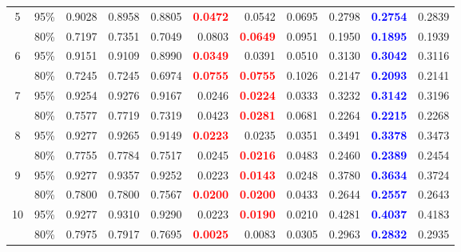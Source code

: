 \begin{longtable}{ccrrrrrrrrr}
\cmidrule(lr){1-11}
5 & 95\% & 0.9028 & 0.8958 & 0.8805 & \textcolor{red}{\textbf{0.0472}} & 0.0542 & 0.0695 & 0.2798 & \textcolor{blue}{\textbf{0.2754}} & 0.2839 \\
 & 80\% & 0.7197 & 0.7351 & 0.7049 & 0.0803 & \textcolor{red}{\textbf{0.0649}} & 0.0951 & 0.1950 & \textcolor{blue}{\textbf{0.1895}} & 0.1939 \\
\cmidrule(lr){1-11}
6 & 95\% & 0.9151 & 0.9109 & 0.8990 & \textcolor{red}{\textbf{0.0349}} & 0.0391 & 0.0510 & 0.3130 & \textcolor{blue}{\textbf{0.3042}} & 0.3116 \\
 & 80\% & 0.7245 & 0.7245 & 0.6974 & \textcolor{red}{\textbf{0.0755}} & \textcolor{red}{\textbf{0.0755}} & 0.1026 & 0.2147 & \textcolor{blue}{\textbf{0.2093}} & 0.2141 \\
\cmidrule(lr){1-11}
7 & 95\% & 0.9254 & 0.9276 & 0.9167 & 0.0246 & \textcolor{red}{\textbf{0.0224}} & 0.0333 & 0.3232 & \textcolor{blue}{\textbf{0.3142}} & 0.3196 \\
 & 80\% & 0.7577 & 0.7719 & 0.7319 & 0.0423 & \textcolor{red}{\textbf{0.0281}} & 0.0681 & 0.2264 & \textcolor{blue}{\textbf{0.2215}} & 0.2268 \\
\cmidrule(lr){1-11}
8 & 95\% & 0.9277 & 0.9265 & 0.9149 & \textcolor{red}{\textbf{0.0223}} & 0.0235 & 0.0351 & 0.3491 & \textcolor{blue}{\textbf{0.3378}} & 0.3473 \\
 & 80\% & 0.7755 & 0.7784 & 0.7517 & 0.0245 & \textcolor{red}{\textbf{0.0216}} & 0.0483 & 0.2460 & \textcolor{blue}{\textbf{0.2389}} & 0.2454 \\
\cmidrule(lr){1-11}
9 & 95\% & 0.9277 & 0.9357 & 0.9252 & 0.0223 & \textcolor{red}{\textbf{0.0143}} & 0.0248 & 0.3780 & \textcolor{blue}{\textbf{0.3634}} & 0.3724 \\
 & 80\% & 0.7800 & 0.7800 & 0.7567 & \textcolor{red}{\textbf{0.0200}} & \textcolor{red}{\textbf{0.0200}} & 0.0433 & 0.2644 & \textcolor{blue}{\textbf{0.2557}} & 0.2643 \\
\cmidrule(lr){1-11}
10 & 95\% & 0.9277 & 0.9310 & 0.9290 & 0.0223 & \textcolor{red}{\textbf{0.0190}} & 0.0210 & 0.4281 & \textcolor{blue}{\textbf{0.4037}} & 0.4183 \\
 & 80\% & 0.7975 & 0.7917 & 0.7695 & \textcolor{red}{\textbf{0.0025}} & 0.0083 & 0.0305 & 0.2963 & \textcolor{blue}{\textbf{0.2832}} & 0.2935 \\
\bottomrule
\end{longtable}
\endgroup
\endgroup
